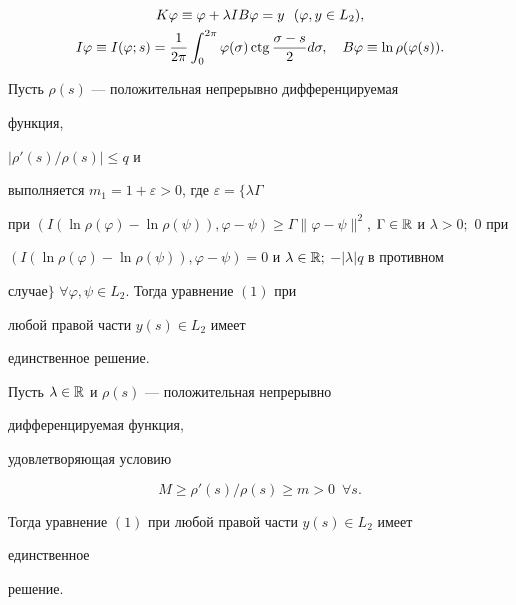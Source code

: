 \begin{gather*}


K\varphi\equiv\varphi+\lambda I B\varphi=y\ \ (\varphi,y\in L_2),\\


I\varphi\equiv I(\varphi;s)=\frac{1}{2\pi}\int^{2\pi}_0


\varphi(\sigma)\ctg\frac{\sigma-s}{2}d\sigma,\quad


B\varphi\equiv \ln\rho(\varphi(s)).


\end{gather*}





\begin{thm}


Пусть $\rho(s)$ --- положительная непрерывно дифференцируемая


функция, \linebreak


$|\rho'(s)/\rho(s)|\le q$ и 


выполняется $m_1=1+\varepsilon>0$, где $\varepsilon=\{\lambda\Gamma$ 


при $(I(\ln\rho(\varphi)-\ln\rho(\psi)),\varphi-\psi)\ge 


\Gamma\|\varphi-\psi\|^2$, $\Gamma\in\Bbb R$ и $\lambda>0;$ $0$ при 


$(I(\ln\rho(\varphi)-\ln\rho(\psi)),\varphi-\psi)=0$ и $\lambda\in\Bbb 


R;$ $-|\lambda|q$ в противном 


случае$\}$ $\forall\varphi,\psi\in L_2$. Тогда уравнение $(1)$ при 


любой правой части $y(s)\in L_2$ имеет 


единственное решение.


\end{thm}





\begin{thm}


Пусть $\lambda\in\Bbb R$ и $\rho(s)$ --- положительная непрерывно 


дифференцируемая функция, 


удовлетворяющая условию


$$


M\ge\rho'(s)/\rho(s)\ge m>0\ \; \forall s.


$$


Тогда уравнение $(1)$ при любой правой части $y(s)\in L_2$ имеет 


единственное 


решение.


\end{thm}





